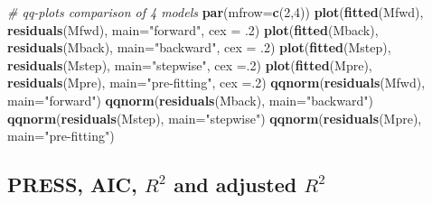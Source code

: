 \documentclass[]{article}
\newenvironment{Shaded}{\begin{snugshade}}{\end{snugshade}}
\newcommand{\KeywordTok}[1]{\textcolor[rgb]{0.13,0.29,0.53}{\textbf{#1}}}
\newcommand{\DataTypeTok}[1]{\textcolor[rgb]{0.13,0.29,0.53}{#1}}
\newcommand{\DecValTok}[1]{\textcolor[rgb]{0.00,0.00,0.81}{#1}}
\newcommand{\StringTok}[1]{\textcolor[rgb]{0.31,0.60,0.02}{#1}}
\newcommand{\CommentTok}[1]{\textcolor[rgb]{0.56,0.35,0.01}{\textit{#1}}}
\newcommand{\NormalTok}[1]{#1}
\begin{document}
\begin{Shaded}
\begin{Highlighting}[]
\CommentTok{# qq-plots comparison of 4 models}
\KeywordTok{par}\NormalTok{(}\DataTypeTok{mfrow=}\KeywordTok{c}\NormalTok{(}\DecValTok{2}\NormalTok{,}\DecValTok{4}\NormalTok{))}
\KeywordTok{plot}\NormalTok{(}\KeywordTok{fitted}\NormalTok{(Mfwd), }\KeywordTok{residuals}\NormalTok{(Mfwd), }\DataTypeTok{main=}\StringTok{"forward"}\NormalTok{, }\DataTypeTok{cex =}\NormalTok{ .}\DecValTok{2}\NormalTok{)}
\KeywordTok{plot}\NormalTok{(}\KeywordTok{fitted}\NormalTok{(Mback), }\KeywordTok{residuals}\NormalTok{(Mback), }\DataTypeTok{main=}\StringTok{"backward"}\NormalTok{, }\DataTypeTok{cex =}\NormalTok{ .}\DecValTok{2}\NormalTok{)}
\KeywordTok{plot}\NormalTok{(}\KeywordTok{fitted}\NormalTok{(Mstep), }\KeywordTok{residuals}\NormalTok{(Mstep), }\DataTypeTok{main=}\StringTok{"stepwise"}\NormalTok{, }\DataTypeTok{cex =}\NormalTok{.}\DecValTok{2}\NormalTok{)}
\KeywordTok{plot}\NormalTok{(}\KeywordTok{fitted}\NormalTok{(Mpre), }\KeywordTok{residuals}\NormalTok{(Mpre), }\DataTypeTok{main=}\StringTok{"pre-fitting"}\NormalTok{, }\DataTypeTok{cex =}\NormalTok{.}\DecValTok{2}\NormalTok{)}
\KeywordTok{qqnorm}\NormalTok{(}\KeywordTok{residuals}\NormalTok{(Mfwd), }\DataTypeTok{main=}\StringTok{"forward"}\NormalTok{)}
\KeywordTok{qqnorm}\NormalTok{(}\KeywordTok{residuals}\NormalTok{(Mback), }\DataTypeTok{main=}\StringTok{"backward"}\NormalTok{)}
\KeywordTok{qqnorm}\NormalTok{(}\KeywordTok{residuals}\NormalTok{(Mstep), }\DataTypeTok{main=}\StringTok{"stepwise"}\NormalTok{)}
\KeywordTok{qqnorm}\NormalTok{(}\KeywordTok{residuals}\NormalTok{(Mpre), }\DataTypeTok{main=}\StringTok{"pre-fitting"}\NormalTok{)}
\end{Highlighting}
\end{Shaded}

\subsection{\texorpdfstring{PRESS, AIC, \(R^2\) and adjusted
\(R^2\)}{PRESS, AIC, R\^{}2 and adjusted R\^{}2}}\label{press-aic-r2-and-adjusted-r2-1}
\end{document}
